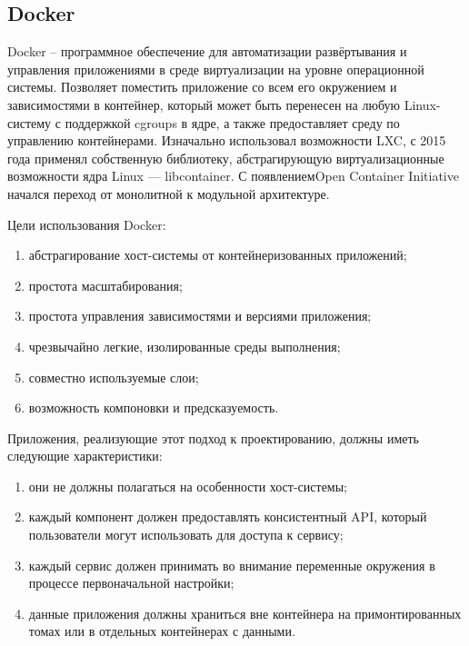 \subsection{Docker}
\label{sec:development:docker}

Docker -- программное обеспечение для автоматизации развёртывания и управления приложениями в среде виртуализации на уровне операционной системы. Позволяет поместить приложение со всем его окружением и зависимостями в контейнер, который может быть перенесен на любую Linux-систему с поддержкой cgroups в ядре, а также предоставляет среду по управлению контейнерами. Изначально использовал возможности LXC, с 2015 года применял собственную библиотеку, абстрагирующую виртуализационные возможности ядра Linux — libcontainer. С появлением ​Open Container Initiative начался переход от монолитной к модульной архитектуре.

Цели использования Docker:
\begin{enumerate}
  \item абстрагирование хост-системы от контейнеризованных приложений;
  \item простота масштабирования;
  \item простота управления зависимостями и версиями приложения;
  \item чрезвычайно легкие, изолированные среды выполнения;
  \item совместно используемые слои;
  \item возможность компоновки и предсказуемость.
\end{enumerate}

Приложения, реализующие этот подход к проектированию, должны иметь следующие характеристики:
\begin{enumerate}
  \item они не должны полагаться на особенности хост-системы;
  \item каждый компонент должен предоставлять консистентный API, который пользователи могут использовать для доступа к сервису;
  \item каждый сервис должен принимать во внимание переменные окружения в процессе первоначальной настройки;
  \item данные приложения должны храниться вне контейнера на примонтированных томах или в отдельных контейнерах с данными.
\end{enumerate}
